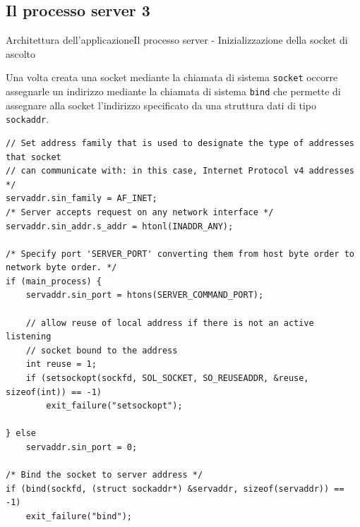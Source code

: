 \documentclass[10pt]{beamer}
\begin{document}
\subsection{Il processo server 3}
\begin{frame}[fragile]{Architettura dell'applicazione}{Il processo server - Inizializzazione della socket di ascolto}

Una volta creata una socket mediante la chiamata di sistema \texttt{socket} occorre assegnarle un indirizzo mediante la chiamata di sistema \texttt{bind} che permette di assegnare alla socket l'indirizzo specificato da una struttura dati di tipo \texttt{sockaddr}.

\begin{lstlisting}
// Set address family that is used to designate the type of addresses that socket 
// can communicate with: in this case, Internet Protocol v4 addresses */
servaddr.sin_family = AF_INET;
/* Server accepts request on any network interface */
servaddr.sin_addr.s_addr = htonl(INADDR_ANY);

/* Specify port 'SERVER_PORT' converting them from host byte order to network byte order. */
if (main_process) {
	servaddr.sin_port = htons(SERVER_COMMAND_PORT);

	// allow reuse of local address if there is not an active listening
	// socket bound to the address
	int reuse = 1;
	if (setsockopt(sockfd, SOL_SOCKET, SO_REUSEADDR, &reuse, sizeof(int)) == -1)
		exit_failure("setsockopt");

} else
	servaddr.sin_port = 0;

/* Bind the socket to server address */
if (bind(sockfd, (struct sockaddr*) &servaddr, sizeof(servaddr)) == -1)
	exit_failure("bind");
\end{lstlisting}

\end{frame}


\end{document}
